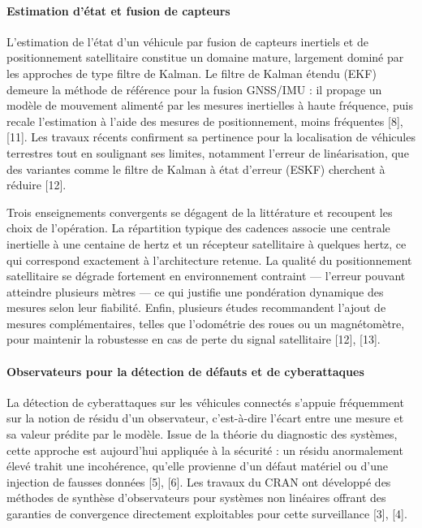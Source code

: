 \documentclass[11pt,a4paper]{article}
\begin{document}
\paragraph{Estimation d’état et fusion de capteurs}

L’estimation de l’état d’un véhicule par fusion de capteurs inertiels et de positionnement satellitaire constitue un domaine mature, largement dominé par les approches de type filtre de Kalman. Le filtre de Kalman étendu (EKF) demeure la méthode de référence pour la fusion GNSS/IMU : il propage un modèle de mouvement alimenté par les mesures inertielles à haute fréquence, puis recale l’estimation à l’aide des mesures de positionnement, moins fréquentes [8], [11]. Les travaux récents confirment sa pertinence pour la localisation de véhicules terrestres tout en soulignant ses limites, notamment l’erreur de linéarisation, que des variantes comme le filtre de Kalman à état d’erreur (ESKF) cherchent à réduire [12].

Trois enseignements convergents se dégagent de la littérature et recoupent les choix de l’opération. La répartition typique des cadences associe une centrale inertielle à une centaine de hertz et un récepteur satellitaire à quelques hertz, ce qui correspond exactement à l’architecture retenue. La qualité du positionnement satellitaire se dégrade fortement en environnement contraint — l’erreur pouvant atteindre plusieurs mètres — ce qui justifie une pondération dynamique des mesures selon leur fiabilité. Enfin, plusieurs études recommandent l’ajout de mesures complémentaires, telles que l’odométrie des roues ou un magnétomètre, pour maintenir la robustesse en cas de perte du signal satellitaire [12], [13].

\paragraph{Observateurs pour la détection de défauts et de cyberattaques}

La détection de cyberattaques sur les véhicules connectés s’appuie fréquemment sur la notion de résidu d’un observateur, c’est-à-dire l’écart entre une mesure et sa valeur prédite par le modèle. Issue de la théorie du diagnostic des systèmes, cette approche est aujourd’hui appliquée à la sécurité : un résidu anormalement élevé trahit une incohérence, qu’elle provienne d’un défaut matériel ou d’une injection de fausses données [5], [6]. Les travaux du CRAN ont développé des méthodes de synthèse d’observateurs pour systèmes non linéaires offrant des garanties de convergence directement exploitables pour cette surveillance [3], [4].
\end{document}
